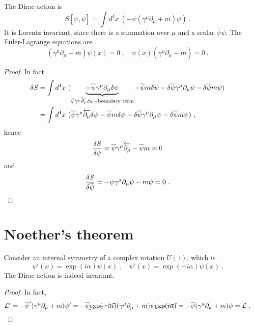     The Dirac action is 
    \begin{equation*}
        S [\psi, \overline \psi] = \int d^4 x ~ (- \overline \psi (\gamma^\mu \partial_\mu + m) \psi) ~.
    \end{equation*}
    It is Lorentz invariant, since there is a summation over $\mu$ and a scalar $\overline \psi \psi$. The Euler-Lagrange equations are 
    \begin{equation*}
        (\gamma^\mu \partial_\mu + m) \psi (x) = 0 ~, \quad \overline \psi (x) (\gamma^\mu \overleftarrow{\partial_\mu} - m) = 0 ~.
    \end{equation*}
    \begin{proof}
        In fact 
        \begin{equation*}
        \begin{aligned}
            \delta S &= \int d^4 x ~ (\underbrace{- \overline \psi \gamma^\mu \partial_\mu \delta \psi}_{\overline \psi \gamma^\mu \overleftarrow{\partial_\mu} \delta \psi - \textnormal{boundary term}} - \overline \psi m \delta \psi - \delta \overline \psi \gamma^\mu \partial_\mu \psi - \delta \overline \psi m \psi) \\ & = \int d^4 x ~ (\overline \psi \gamma^\mu \overleftarrow{\partial_\mu} \delta \psi - \overline \psi m \delta \psi - \delta \overline \psi \gamma^\mu \partial_\mu \psi - \delta \overline \psi m \psi) ~,
        \end{aligned}
        \end{equation*}
        hence 
        \begin{equation*}
            \frac{\delta S}{\delta \psi} = \overline \psi \gamma^\mu \overleftarrow{\partial_\mu} - \overline \psi m = 0
        \end{equation*}
        and 
        \begin{equation*}
            \frac{\delta S}{\delta \overline \psi} = - \psi \gamma^\mu \partial_\mu \psi - m \psi = 0 ~.
        \end{equation*}
    \end{proof}

\section{Noether's theorem}

    Consider an internal symmetry of a complex rotation $U(1)$, which is 
    \begin{equation*}
        \psi'(x) = \exp(i \alpha) \psi(x) ~, \quad \overline \psi'(x) = \exp(- i \alpha) \overline \psi (x) ~.
    \end{equation*} 
    The Dirac action is indeed invariant.
    \begin{proof}
        In fact, 
        \begin{equation*}
            \mathcal L' = - \overline \psi' (\gamma^\mu \partial_\mu + m) \psi' = - \overline \psi \cancel{\exp(- i \alpha) }(\gamma^\mu \partial_\mu + m) \psi \cancel{ \exp(i \alpha)} = - \overline \psi (\gamma^\mu \partial_\mu + m) \psi = \mathcal L ~.
        \end{equation*}
    \end{proof}

